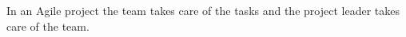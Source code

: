 \begin{savequote}[75mm]
In an Agile project the team takes care of the tasks and the project leader takes care of the team.
\end{savequote}


